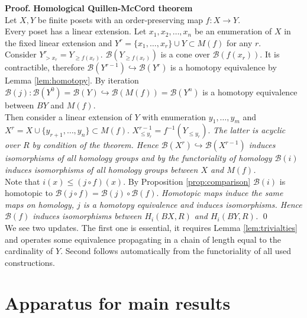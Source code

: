 \documentclass[a4paper, 12pt]{article}
\numberwithin{equation}{section}
\theoremstyle{definition}
\theoremstyle{remark}
\newenvironment{pf}{\noindent\textbf{Proof.}}{\qed}
\renewcommand{\leq}{\leqslant}
\renewcommand{\geq}{\geqslant}
\begin{document}
\begin{pf} \textbf{Homological Quillen-McCord theorem}\\
Let $X, Y$ be finite posets with an order-preserving map $f : X \to Y$.\\

Every poset has a linear extension. Let $x_1, x_2, \ldots, x_n$ be an enumeration of $X$ in the fixed linear extension and $Y^r = \{x_1,\ldots,x_r\} \cup Y \subset M(f)$ for any $r$.\\

Consider $Y^r_{>x_r} = Y_{\geq f(x_r)}$. $\mathcal{B}(Y_{\geq f(x_r)})$ is a cone over $\mathcal{B}(f(x_r))$. It is contractible, therefore $\mathcal{B}(Y^{r-1}) \hookrightarrow \mathcal{B}(Y^{r})$ is a homotopy equivalence by Lemma \ref{lem:homotopy}. By iteration $\mathcal{B}(j) : \mathcal{B}(Y^{0}) = \mathcal{B}(Y) \hookrightarrow \mathcal{B}(M(f)) = \mathcal{B}(Y^n)$ is a homotopy equivalence between $BY$ and $M(f)$.\\

Then consider a linear extension of $Y$ with enumeration $y_1,\ldots,y_m$ and $X^r = X \cup \{y_{r+1},\ldots,y_n\} \subset M(f)$. $X^{r-1}_{\leq y_r} = f^{-1}(Y_{\leqslant y_r})$. \textit{The latter is acyclic over $R$ by condition of the theorem. Hence $\mathcal{B}(X^{r}) \hookrightarrow \mathcal{B}(X^{r-1})$ induces isomorphisms of all homology groups and by the functoriality of homology $\mathcal{B}(i)$ induces isomorphisms of all homology groups between $X$ and $M(f)$.}\\

Note that $i(x) \leqslant (j \circ f)(x)$. By Proposition \ref{prop:comparison} $\mathcal{B}(i)$ is homotopic to $\mathcal{B}(j \circ f) = \mathcal{B}(j) \circ \mathcal{B}(f)$. \textit{Homotopic maps induce the same maps on homology, $j$ is a homotopy equivalence and induces isomorphisms. Hence $\mathcal{B}(f)$ induces isomorphisms between $H_i(BX,R)$ and $H_i(BY,R)$.}
\end{pf}\\

We see two updates. The first one is essential, it requires Lemma \ref{lem:trivialties} and operates some equivalence propagating in a chain of length equal to the cardinality of $Y$. Second follows automatically from the functoriality of all used constructions.

\section{Apparatus for main results}
\end{document}
